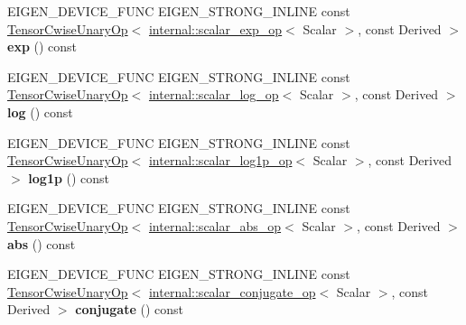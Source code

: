 \begin{DoxyCompactItemize}
E\+I\+G\+E\+N\+\_\+\+D\+E\+V\+I\+C\+E\+\_\+\+F\+U\+NC E\+I\+G\+E\+N\+\_\+\+S\+T\+R\+O\+N\+G\+\_\+\+I\+N\+L\+I\+NE const \hyperlink{class_eigen_1_1_tensor_cwise_unary_op}{Tensor\+Cwise\+Unary\+Op}$<$ \hyperlink{struct_eigen_1_1internal_1_1scalar__exp__op}{internal\+::scalar\+\_\+exp\+\_\+op}$<$ Scalar $>$, const Derived $>$ {\bfseries exp} () const
\item 
\mbox{\label{class_eigen_1_1_tensor_base_3_01_derived_00_01_read_only_accessors_01_4_a608a08786b1c99d7d4bd911e3e941023}} 
E\+I\+G\+E\+N\+\_\+\+D\+E\+V\+I\+C\+E\+\_\+\+F\+U\+NC E\+I\+G\+E\+N\+\_\+\+S\+T\+R\+O\+N\+G\+\_\+\+I\+N\+L\+I\+NE const \hyperlink{class_eigen_1_1_tensor_cwise_unary_op}{Tensor\+Cwise\+Unary\+Op}$<$ \hyperlink{struct_eigen_1_1internal_1_1scalar__log__op}{internal\+::scalar\+\_\+log\+\_\+op}$<$ Scalar $>$, const Derived $>$ {\bfseries log} () const
\item 
\mbox{\label{class_eigen_1_1_tensor_base_3_01_derived_00_01_read_only_accessors_01_4_aab463c553eb730d92d74c156fde28fa9}} 
E\+I\+G\+E\+N\+\_\+\+D\+E\+V\+I\+C\+E\+\_\+\+F\+U\+NC E\+I\+G\+E\+N\+\_\+\+S\+T\+R\+O\+N\+G\+\_\+\+I\+N\+L\+I\+NE const \hyperlink{class_eigen_1_1_tensor_cwise_unary_op}{Tensor\+Cwise\+Unary\+Op}$<$ \hyperlink{struct_eigen_1_1internal_1_1scalar__log1p__op}{internal\+::scalar\+\_\+log1p\+\_\+op}$<$ Scalar $>$, const Derived $>$ {\bfseries log1p} () const
\item 
\mbox{\label{class_eigen_1_1_tensor_base_3_01_derived_00_01_read_only_accessors_01_4_a05d7856b45ea05e6dae6174c7f9a08fd}} 
E\+I\+G\+E\+N\+\_\+\+D\+E\+V\+I\+C\+E\+\_\+\+F\+U\+NC E\+I\+G\+E\+N\+\_\+\+S\+T\+R\+O\+N\+G\+\_\+\+I\+N\+L\+I\+NE const \hyperlink{class_eigen_1_1_tensor_cwise_unary_op}{Tensor\+Cwise\+Unary\+Op}$<$ \hyperlink{struct_eigen_1_1internal_1_1scalar__abs__op}{internal\+::scalar\+\_\+abs\+\_\+op}$<$ Scalar $>$, const Derived $>$ {\bfseries abs} () const
\item 
\mbox{\label{class_eigen_1_1_tensor_base_3_01_derived_00_01_read_only_accessors_01_4_ad78dc59305c20944c496f29cac3d8e7e}} 
E\+I\+G\+E\+N\+\_\+\+D\+E\+V\+I\+C\+E\+\_\+\+F\+U\+NC E\+I\+G\+E\+N\+\_\+\+S\+T\+R\+O\+N\+G\+\_\+\+I\+N\+L\+I\+NE const \hyperlink{class_eigen_1_1_tensor_cwise_unary_op}{Tensor\+Cwise\+Unary\+Op}$<$ \hyperlink{struct_eigen_1_1internal_1_1scalar__conjugate__op}{internal\+::scalar\+\_\+conjugate\+\_\+op}$<$ Scalar $>$, const Derived $>$ {\bfseries conjugate} () const

\end{DoxyCompactItemize}
